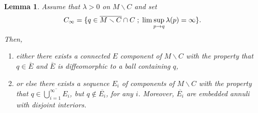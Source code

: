 \documentclass[10pt]{amsart}
\let\moins\smallsetminus
\newcommand{\sep}{\;;\;}
\newtheorem{lemma}[theorem]{Lemma}
\theoremstyle{definition}
\theoremstyle{remark}
\numberwithin{equation}{section}
\begin{document}
\begin{lemma}\label{poles}
Assume that $\lambda >0$ on $M\moins C$ and set
\[C_{\infty}= \{q\in \overline{M\moins C}\cap C\sep \lim\sup_{p\to q}\lambda (p) =\infty\}.\vspace*{-3pt}\]
Then,
\begin{enumerate}
\item either there exists a connected $E$ component of $M\moins C$ with the property that
$q\in\overline{E}$ and $\overline{E}$ is diffeomorphic to a ball containing $q$,
\item or else there exists a sequence $E_i$ of components of $M\moins C$
with the property that $q\in \overline{\bigcup_{i=1}^{\infty} E_i}$, but
$q\not\in \overline{E_i}$, for any $i$. Moreover, $\overline{E_i}$ are embedded annuli with disjoint interiors.
\end{enumerate}
\end{lemma}
\end{document}
